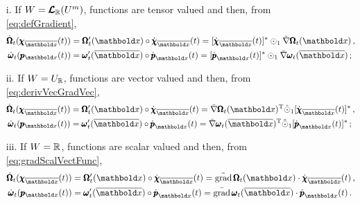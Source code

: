 \begin{itemize}
    \setlength\itemsep{.1em}
    \item[i.] If $W=\pmb{\mathcal{L}}_{\mathbb{R}}(U^m)$, functions are tensor valued and then, from \eqref{eq:defGradient}, 
\begin{equation}
\begin{aligned}
\dot{\tnr{\Omega}}_{t}(\tnr{\chi}_{\overline{\vto{x}}}(t))&=\tnr{\Omega}_t'(\vto{x})\circ\dot{\tnr{\chi}}_{\overline{\vto{x}}}(t)=[\dot{\tnr{\chi}}_{\overline{\vto{x}}}(t)]^*\odot_1\fua{\tilde{\nabla}\tnr{\Omega}_t}{{\vto{x}}}\,,\\
\dot{\tnr{\omega}}_{t}(\tnr{p}_{{\vto{x}}}(t))&=\tnr{\omega}_t'(\overline{\vto{x}})\circ\dot{\tnr{p}}_{{\vto{x}}}(t)=[\dot{\tnr{p}}_{{\vto{x}}}(t)]^*\odot_1\fua{\bar{\nabla}\tnr{\omega}_t}{\overline{\vto{x}}}\,;
\end{aligned} 
\end{equation}   
    \item[ii.] If $W=U_{\mathbb{R}}$, functions are vector valued and then, from \eqref{eq:derivVecGradVec},
\begin{equation}\label{eq:compoVector}
\begin{aligned}
\dot{\tnr{\Omega}}_{t}(\tnr{\chi}_{\overline{\vto{x}}}(t))&=\tnr{\Omega}_t'(\vto{x})\circ\dot{\tnr{\chi}}_{\overline{\vto{x}}}(t)=\fua{\tilde{\nabla}\tnr{\Omega}_t}{{\vto{x}}}^{\text{T}}\hat{\odot}_1[\dot{\tnr{\chi}}_{\overline{\vto{x}}}(t)]^*\,,\\
\dot{\tnr{\omega}}_{t}(\tnr{p}_{{\vto{x}}}(t))&=\tnr{\omega}_t'(\overline{\vto{x}})\circ\dot{\tnr{p}}_{{\vto{x}}}(t)=\fua{\bar{\nabla}\tnr{\omega}_t}{\overline{\vto{x}}}^{\text{T}}\hat{\odot}_1[\dot{\tnr{p}}_{{\vto{x}}}(t)]^*\,;
\end{aligned} 
\end{equation} 
\item[iii.] If $W=\mathbb{R}$, functions are scalar valued and then, from \eqref{eq:gradScalVectFunc},
\begin{equation}
\begin{aligned}
\dot{\tnr{\Omega}}_{t}(\tnr{\chi}_{\overline{\vto{x}}}(t))&=\tnr{\Omega}_t'(\vto{x})\circ\dot{\tnr{\chi}}_{\overline{\vto{x}}}(t)=\fua{\tilde{\operatorname{grad}}\,{\tnr{\Omega}_t}}{{\vto{x}}}\cdot\dot{\tnr{\chi}}_{\overline{\vto{x}}}(t)\,,\\
\dot{\tnr{\omega}}_{t}(\tnr{p}_{{\vto{x}}}(t))&=\tnr{\omega}_t'(\overline{\vto{x}})\circ\dot{\tnr{p}}_{{\vto{x}}}(t)=\fua{\bar{\operatorname{grad}}\,{\tnr{\omega}_t}}{\overline{\vto{x}}}\cdot\dot{\tnr{p}}_{{\vto{x}}}(t)\,.
\end{aligned} 
\end{equation} 
\end{itemize}
